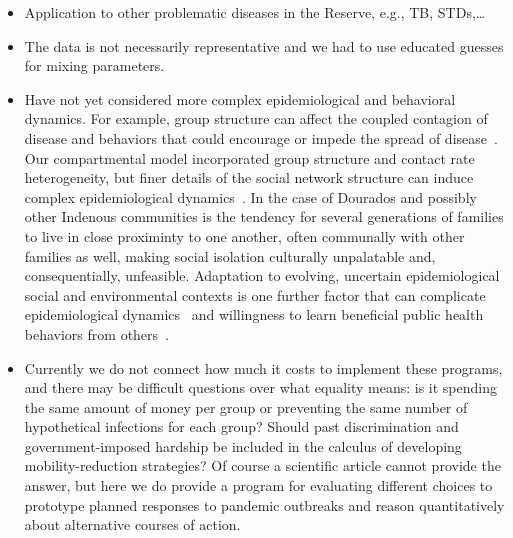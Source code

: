 \documentclass[
  letterpaper,
  abstract]{scrartcl}
\begin{document}
\begin{itemize}
  \item 
    Application to other problematic diseases in the Reserve, e.g., TB, STDs,\ldots 
  \item
    The data is not necessarily representative and we had to use educated guesses
    for mixing parameters.
  \item
    Have not yet considered more complex epidemiological and behavioral
    dynamics. For example, group structure can affect the coupled contagion of
    disease and behaviors that could encourage or impede the spread of
    disease~\autocite{SmaldinoJones2021}. Our compartmental model
    incorporated group structure and contact rate heterogeneity, but finer
    details of the social network structure can induce complex
    epidemiological dynamics~\autocite{Arthur2017}. In the case of Dourados
    and possibly other Indenous communities is the tendency for several
    generations of families to live in close proximinty to one another,
    often communally with other families as well, making social isolation
    culturally unpalatable and, consequentially, unfeasible. Adaptation to
    evolving, uncertain epidemiological social and environmental contexts is
    one further factor that can complicate epidemiological
    dynamics~\autocite{Arthur2021} and willingness to learn beneficial public
    health behaviors from others~\autocite{Turner2023a}.
  \item
    Currently we do not connect how much it costs to implement these programs,
    and there may be difficult questions over what equality means: is it
    spending the same amount of money per group or preventing the same number of
    hypothetical infections for each group? Should past discrimination and
    government-imposed hardship be included in the calculus of developing
    mobility-reduction strategies? Of course a scientific article 
    cannot provide the answer, but here we do provide a program for evaluating
    different choices to prototype planned responses to pandemic outbreaks and
    reason quantitatively about alternative courses of action.
\end{itemize}


\printbibliography[title=References]


\clearpage
\end{document}
